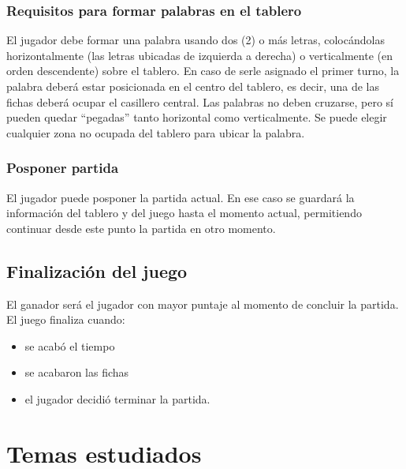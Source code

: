 \documentclass[11pt,fleqn]{book} %
\begin{document}

\subsection{Requisitos para formar palabras en el tablero}
El jugador debe formar una palabra usando dos (2) o más letras, colocándolas horizontalmente (las letras ubicadas de izquierda a derecha) o verticalmente (en orden descendente) sobre el tablero. 
En caso de serle asignado el primer turno, la palabra deberá estar posicionada en el centro del tablero, es decir, una de las fichas deberá ocupar el casillero central.
Las palabras no deben cruzarse, pero sí pueden quedar “pegadas” tanto horizontal como verticalmente.
Se puede elegir cualquier zona no ocupada del tablero para ubicar la palabra.

\subsection{Posponer partida}
El jugador puede posponer la partida actual. En ese caso se guardará la información del tablero y del juego hasta el momento actual, permitiendo continuar desde este punto la partida en otro momento.

\section{Finalización del juego}
El ganador será el jugador con mayor puntaje al momento de concluir la partida. El juego finaliza cuando:

\begin{itemize}
    \item se acabó el tiempo
    \item se acabaron las fichas
    \item el jugador decidió terminar la partida.
\end{itemize}



\chapter{Temas estudiados}
\vspace*{1cm}
\end{document}
